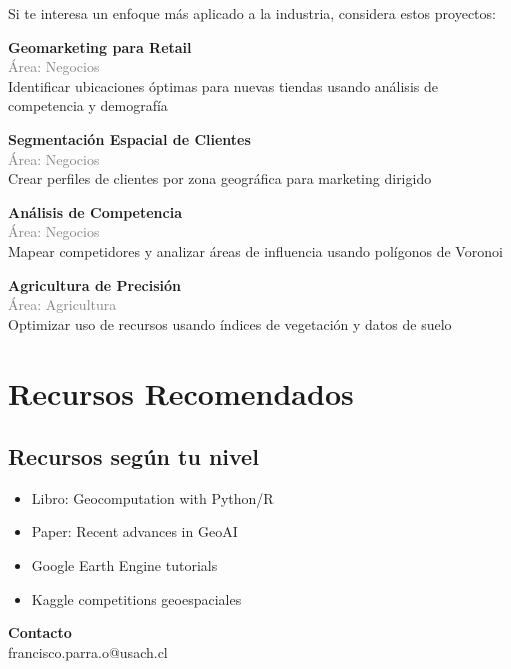 \documentclass[11pt,a4paper]{article}
\begin{document}
Si te interesa un enfoque más aplicado a la industria, considera estos proyectos:


\begin{tcolorbox}[colback=orange!5,colframe=darkorange,title={\small Proyecto Comercial \#1}]
\textbf{Geomarketing para Retail}\\[0.2cm]
\textcolor{gray}{\small Área: Negocios}\\[0.2cm]
Identificar ubicaciones óptimas para nuevas tiendas usando análisis de competencia y demografía
\end{tcolorbox}


\begin{tcolorbox}[colback=orange!5,colframe=darkorange,title={\small Proyecto Comercial \#2}]
\textbf{Segmentación Espacial de Clientes}\\[0.2cm]
\textcolor{gray}{\small Área: Negocios}\\[0.2cm]
Crear perfiles de clientes por zona geográfica para marketing dirigido
\end{tcolorbox}


\begin{tcolorbox}[colback=orange!5,colframe=darkorange,title={\small Proyecto Comercial \#3}]
\textbf{Análisis de Competencia}\\[0.2cm]
\textcolor{gray}{\small Área: Negocios}\\[0.2cm]
Mapear competidores y analizar áreas de influencia usando polígonos de Voronoi
\end{tcolorbox}


\begin{tcolorbox}[colback=orange!5,colframe=darkorange,title={\small Proyecto Comercial \#4}]
\textbf{Agricultura de Precisión}\\[0.2cm]
\textcolor{gray}{\small Área: Agricultura}\\[0.2cm]
Optimizar uso de recursos usando índices de vegetación y datos de suelo
\end{tcolorbox}


\section*{ Recursos Recomendados}

\subsection*{Recursos según tu nivel}

\begin{itemize}[leftmargin=*]
    \item Libro: Geocomputation with Python/R
    \item Paper: Recent advances in GeoAI
    \item Google Earth Engine tutorials
    \item Kaggle competitions geoespaciales
\end{itemize}


\vspace{0.5cm}

\begin{tcolorbox}[colback=gray!10,colframe=gray!50]
\centering
\textbf{Contacto}\\[0.2cm]
 francisco.parra.o@usach.cl
\end{tcolorbox}
\end{document}
